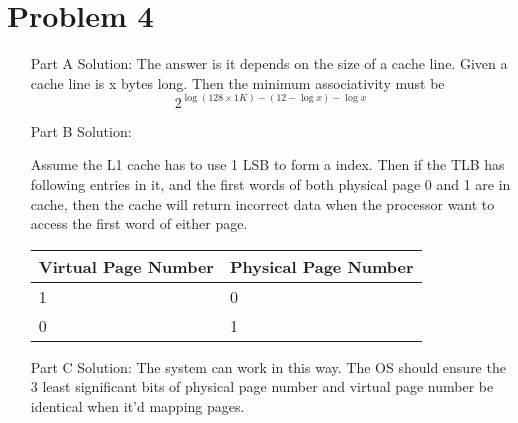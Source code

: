 \documentclass[11pt,leqno]{article}
\begin{document}
\section*{Problem 4}
	\begin{enumerate}
	\item[Part A] Solution:
	The answer is it depends on the size of a cache line. Given a cache line is x bytes long. Then the minimum associativity must be 
	\[
	2^{\log (128 \times 1K) - (12 - \log x) - \log x} 
	\]

	\item[Part B] Solution:
	
	Assume the L1 cache has to use 1 LSB to form a index. Then if the TLB has following entries in it, and the first words of both physical page 0 and 1 are in cache, then the cache will return incorrect data when the processor want to access the first word of either page.
	
	\begin{tabular}{|l|l|}
	Virtual Page Number & Physical Page Number \\
	\hline
	\hline
	1 & 0\\
	\hline
	0 & 1\\
	\hline
	\end{tabular}
	
	\item[Part C] Solution:
	The system can work in this way. The OS should ensure the 3 least significant bits of physical page number and virtual page number be identical when it'd mapping pages.
	
	\end{enumerate}
\end{document}

